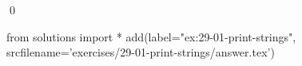
\begin{ex}
  \label{ex:29-01-print-strings}
  
  \qed
\end{ex}
\begin{python0}
from solutions import *
add(label="ex:29-01-print-strings",
    srcfilename='exercises/29-01-print-strings/answer.tex')
\end{python0}
